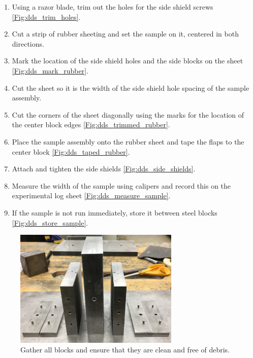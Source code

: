\begin{enumerate}
\item Using a razor blade, trim out the holes for the side shield screws \ref{Fig:dds_trim_holes}.
\item Cut a strip of rubber sheeting and set the sample on it, centered in both directions.
\item Mark the location of the side shield holes and the side blocks on the sheet \ref{Fig:dds_mark_rubber}.
\item Cut the sheet so it is the width of the side shield hole spacing of the sample assembly.
\item Cut the corners of the sheet diagonally using the marks for the location of the center block edges \ref{Fig:dds_trimmed_rubber}.
\item Place the sample assembly onto the rubber sheet and tape the flaps to the center block \ref{Fig:dds_taped_rubber}.
\item Attach and tighten the side shields \ref{Fig:dds_side_shields}.
\item Measure the width of the sample using calipers and record this on the experimental log sheet \ref{Fig:dds_measure_sample}.
\item If the sample is not run immediately, store it between steel blocks \ref{Fig:dds_store_sample}.
\end{enumerate}

\begin{figure}
	\centering
        \includegraphics[width=0.7\textwidth]{appendix_sample_prep/dds_clean_blocks.jpg}
   	\caption{Gather all blocks and ensure that they are clean and free of debris.}
  	\label{Fig:dds_clean}
\end{figure}

